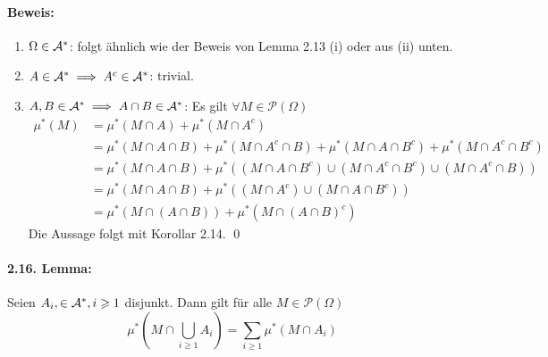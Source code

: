 \paragraph{Beweis:}
\begin{enumerate}[label=(\roman*)]
    \item $\Omega\in\mathcal{A}^*$: folgt \"ahnlich wie der Beweis von Lemma 2.13 (i) oder aus (ii) unten.
    \item $A\in\mathcal{A}^*\implies A^c\in\mathcal{A}^*$: trivial.
    \item $A,B\in\mathcal{A}^*\implies A\cap B\in\mathcal{A}^*$: Es gilt $\forall M\in\mathcal{P}(\Omega)$
    \begin{align*}
        \mu^*(M)&=\mu^*(M\cap A)+\mu^*(M\cap A^c)\\
        &=\mu^*(M\cap A\cap B)+\mu^*(M\cap A^c\cap B)+\mu^*(M\cap A\cap B^c)+\mu^*(M\cap A^c\cap B^c)\\
        &=\mu^*(M\cap A\cap B)+\mu^*\left((M\cap A\cap B^c)\cup(M\cap A^c\cap B^c)\cup(M\cap A^c\cap B)\right)\\
        &=\mu^*(M\cap A\cap B)+\mu^*\left((M\cap A^c)\cup(M\cap A\cap B^c)\right)\\
        &=\mu^*(M\cap(A\cap B))+\mu^*(M\cap(A\cap B)^c)
    \end{align*}
    Die Aussage folgt mit Korollar 2.14. \qed
\end{enumerate}

\paragraph{2.16. Lemma:}Seien $A_i,\in\mathcal{A}^*,i\geqslant1$ disjunkt. Dann gilt f\"ur alle $M\in\mathcal{P}(\Omega)$
$$\mu^*\left(M\cap\bigcup_{i\geq1}A_i\right)=\sum_{i\geq1}\mu^*(M\cap A_i)$$

